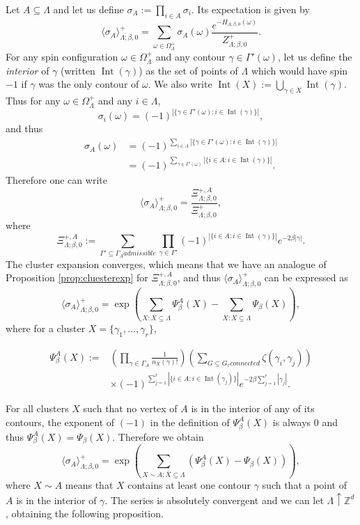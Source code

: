 \documentclass{amsart}
\newcommand{\field}[1]{\mathbb{#1}}
\newcommand{\Z}{\field{Z}}
\DeclareMathOperator\Int{Int}
\numberwithin{equation}{section}
\theoremstyle{remark}
\begin{document}
Let $A \subseteq \Lambda$ and let us define $\sigma_A := \prod_{i \in A} \sigma_i$. 
Its expectation is given by
$$\langle \sigma_A \rangle^+_{\Lambda;\beta,0}= \sum_{\omega \in \Omega^+_{\Lambda}} \sigma_A(\omega) \frac{e^{-H_{\Lambda;\beta,0}(\omega)}}{Z^+_{\Lambda; \beta,0}}.$$
For any spin configuration $\omega \in \Omega^+_{\Lambda}$ and any contour  $\gamma \in \Gamma'(\omega)$, let us define the \emph{interior} of $\gamma$ (written $\Int(\gamma)$) as the set of points of $\Lambda$ which would have spin $-1$ if $\gamma$ was the only contour of $\omega$. We also write $\Int(X):=  \bigcup_{\gamma \in X} \Int(\gamma).$ Thus for any $\omega \in \Omega^+_{\Lambda}$ and any $i \in \Lambda$,
$$\sigma_i(\omega) = (-1)^{| \{\gamma \in \Gamma'(\omega) : i \in \Int(\gamma)\}|},$$
and thus
\begin{align*}
\sigma_A(\omega) &= (-1)^{\sum_{i \in A} | \{\gamma \in \Gamma'(\omega) : i \in \Int(\gamma)\}|}
\\&= (-1)^{\sum_{\gamma \in \Gamma'(\omega)} | \{i \in A : i \in \Int(\gamma)\}|}.
\end{align*}
Therefore one can write
$$\langle \sigma_A\rangle^+_{\Lambda;\beta,0}= \frac{\Xi^{+,A}_{\Lambda;\beta,0}}{\Xi^+_{\Lambda;\beta,0}},$$
where
$$\Xi^{+,A}_{\Lambda;\beta,0} := \sum_{\Gamma' \subseteq \Gamma_{\Lambda} admissible} \prod_{\gamma \in \Gamma'} (-1)^{| \{i \in A : i \in \Int(\gamma)\}|} e^{-2 \beta |\gamma|}.$$
The cluster expansion converges, which means that we have an analogue of Proposition \ref{prop:cluesterexp} for $\Xi^{+,A}_{\Lambda;\beta,0}$, and thus $\langle \sigma_A \rangle^+_{\Lambda;\beta,0}$ can be expressed as
$$\langle \sigma_A\rangle^+_{\Lambda;\beta,0} = \exp \left( \sum_{X: \overline{X} \subseteq \Lambda} \Psi^A_{\beta}(X) -  \sum_{X: \overline{X} \subseteq \Lambda} \Psi_{\beta}(X) \right),$$
where for a cluster $X= \{\gamma_1, \dots, \gamma_r\}$,

\begin{align*}
\Psi^A_\beta(X):=& \left( \prod_{\gamma \in \Gamma_{\Lambda}} \frac{1}{n_X(\gamma)!} \right) \left( \sum_{G \subseteq G_r connected} \zeta(\gamma_i,\gamma_j) \right)
\\& \times (-1)^{ \sum_{j=1}^r | \{i \in A : i \in \Int(\gamma_j)\}|} e^{-2 \beta \sum_{j=1}^r |\gamma_j|}.
\end{align*}


For all clusters $X$ such that no vertex of $A$ is in the interior of any of its contours, the exponent of $(-1)$ in the definition of $\Psi^A_\beta(X)$ is always $0$ and thus $\Psi^A_\beta(X)=\Psi_\beta(X).$
Therefore we obtain
$$\langle \sigma_A\rangle^+_{\Lambda;\beta,0} = \exp \left( \sum_{X \sim A : \overline{X} \subseteq \Lambda} (\Psi^A_{\beta}(X) -  \Psi_{\beta}(X)) \right),$$
where $X \sim A$ means that $X$ contains at least one contour $\gamma$ such that a point of $A$ is in the interior of $\gamma$.
The series is absolutely convergent and we can let $\Lambda \uparrow \Z^d$, obtaining the following proposition.
\end{document}
